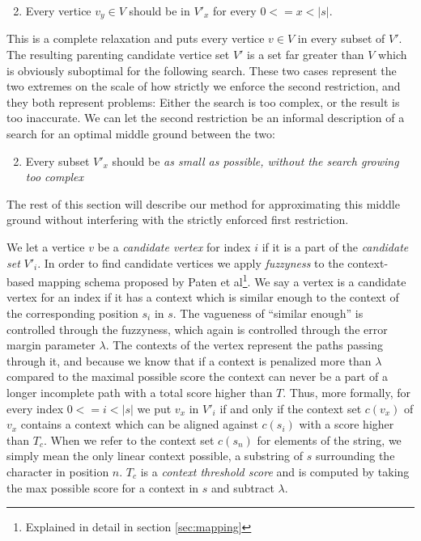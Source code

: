 \documentclass[thesis.tex]{subfiles}
\begin{document}
\begin{enumerate}
  \setcounter{enumi}{1}
  \item Every vertice $v_y \in V$ should be in $V'_x$ for every $0<=x<|s|$.
\end{enumerate}
This is a complete relaxation and puts every vertice $v \in V$ in every subset of $V'$. The resulting parenting candidate vertice set $V'$ is a set far greater than $V$ which is obviously suboptimal for the following search. These two cases represent the two extremes on the scale of how strictly we enforce the second restriction, and they both represent problems: Either the search is too complex, or the result is too inaccurate. We can let the second restriction be an informal description of a search for an optimal middle ground between the two:
\begin{enumerate}
  \setcounter{enumi}{1}
  \item Every subset $V'_x$ should be \textit{as small as possible, without the search growing too complex}
\end{enumerate}
The rest of this section will describe our method for approximating this middle ground without interfering with the strictly enforced first restriction.\\
\par\noindent
We let a vertice $v$ be a \textit{candidate vertex} for index $i$ if it is a part of the \textit{candidate set} $V'_i$. In order to find candidate vertices we apply \textit{fuzzyness} to the context-based mapping schema proposed by Paten et al\footnote{Explained in detail in section \ref{sec:mapping}}. We say a vertex is a candidate vertex for an index if it has a context which is similar enough to the context of the corresponding position $s_i$ in $s$. The vagueness of ``similar enough'' is controlled through the fuzzyness, which again is controlled through the error margin parameter $\lambda$. The contexts of the vertex represent the paths passing through it, and because we know that if a context is penalized more than $\lambda$ compared to the maximal possible score the context can never be a part of a longer incomplete path with a total score higher than $T$. Thus, more formally, for every index $0<=i<|s|$ we put $v_x$ in $V'_i$ if and only if the context set $c(v_x)$ of $v_x$ contains a context which can be aligned against $c(s_i)$ with a score higher than $T_c$. When we refer to the context set $c(s_n)$ for elements of the string, we simply mean the only linear context possible, a substring of $s$ surrounding the character in position $n$. $T_c$ is a \textit{context threshold score} and is computed by taking the max possible score for a context in $s$ and subtract $\lambda$.\\
\end{document}
